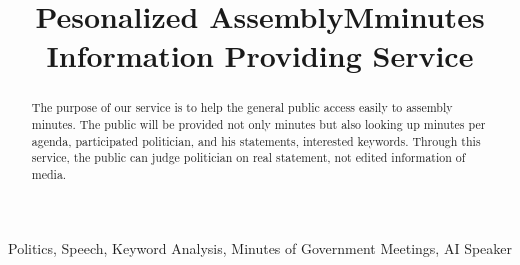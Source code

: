 \documentclass[conference]{IEEEtran}
\begin{document}
\title{Pesonalized AssemblyMminutes Information Providing Service \\
}
\author{
\and
{}
\and
{}
\and
{}
}
\maketitle

\begin{abstract}
The purpose of our service is to help the general public access easily to assembly minutes. The public will be provided not only minutes but also looking up minutes per agenda, participated politician, and his statements, interested keywords. Through this service, the public can judge politician on real statement, not edited information of media.\linebreak \\
\end{abstract}

\begin{IEEEkeywords}
Politics, Speech, Keyword Analysis, Minutes of Government Meetings, AI Speaker  \linebreak \\
\end{IEEEkeywords}
\end{document}
